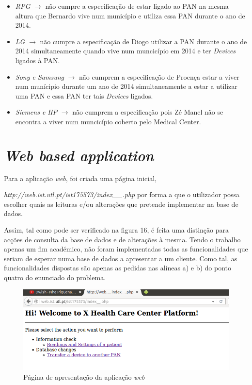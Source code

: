 \documentclass[a4paper]{article}
\begin{document}
	\begin{itemize}
	\item \textit{RPG} $\rightarrow$ não cumpre a especificação de estar ligado ao PAN na mesma
	altura que Bernardo vive num município e utiliza essa PAN durante o ano de 2014.
	
	\item \textit{LG} $\rightarrow$ não cumpre a especificação de Diogo utilizar a PAN durante
	o ano de 2014 simultaneamente quando vive num muncicípio em 2014 e ter
	\textit{Devices} ligados à PAN.
	
	\item \textit{Sony e Samsung} $\rightarrow$ não cumprem a especificação de Proença estar
	a viver num munícipio durante um ano de 2014 simultaneamente a estar
	a utilizar uma PAN e essa PAN ter tais \textit{Devices} ligados.
	
	\item \textit{Siemens e HP} $\rightarrow$ não cumprem a especificação pois Zé Manel não
	se encontra a viver num muncicípio coberto pelo Medical Center.
	\end{itemize}		
	
\section{\textit{Web based application}}
Para a aplicação \textit{web}, foi criada uma página inicial,

\textit{http://web.ist.utl.pt/ist175573/index\_\_.php} por forma a que o utilizador possa escolher quais as leituras e/ou alterações que pretende implementar na base de dados.
 
Assim, tal como pode ser verificado na figura 16, é feita uma distinção para acções de consulta da base de dados e de alterações à mesma. Tendo o trabalho apenas um fim académico, não foram implementadas todas as funcionalidades que seriam de esperar numa base de dados a apresentar a um cliente. Como tal, as funcionalidades dispostas são apenas as pedidas nas alíneas a) e b) do ponto quatro do enunciado do problema.

\begin{figure}[ht!]
\centering
\includegraphics[scale=0.53]{index_php.png}
\caption{Página de apresentação da aplicação \textit{web}}
\end{figure}
	
\end{document}
